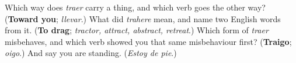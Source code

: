 \begin{tcolorbox}[breakable,colback=teal!4,colframe=teal!35!black,title={Before you move on}]
Which way does \emph{traer} carry a thing, and which verb goes the other way? (\textbf{Toward you}; \emph{llevar}.) What did \emph{trahere} mean, and name two English words from it. (\textbf{To drag}; \emph{tractor, attract, abstract, retreat}.) Which form of \emph{traer} misbehaves, and which verb showed you that same misbehaviour first? (\textbf{Traigo}; \emph{oigo}.) And say you are standing. (\emph{Estoy de pie}.)
\end{tcolorbox}
